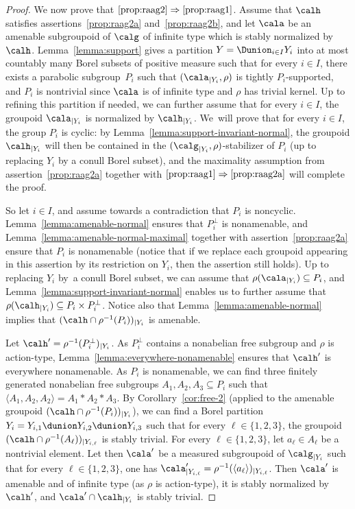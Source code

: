 \begin{proof}
We now prove that $\eqref{prop:raag2}\Rightarrow\eqref{prop:raag1}$. Assume that $\calh$ satisfies assertions~\eqref{prop:raag2a} and~\eqref{prop:raag2b}, and let $\cala$ be an amenable subgroupoid of $\calg$ of infinite type which is stably normalized by $\calh$. Lemma~\ref{lemma:support} gives a partition $Y=\Dunion_{i\in I} Y_i$ into at most countably many Borel subsets of positive measure such that for every $i\in I$, there exists a parabolic subgroup~$P_i$ such that $(\cala_{|Y_i},\rho)$ is tightly $P_i$-supported, and $P_i$ is nontrivial since $\cala$ is of infinite type and $\rho$ has trivial kernel. Up to refining this partition if needed, we can further assume that for every $i\in I$, the groupoid $\cala_{|Y_i}$ is normalized by $\calh_{|Y_i}$. We~will prove that for every $i\in I$, the group $P_i$ is cyclic: by Lemma~\ref{lemma:support-invariant-normal}, the groupoid $\calh_{|Y_i}$ will then be contained in the $(\calg_{|Y_i},\rho)$-stabilizer of $P_i$ (up to replacing $Y_i$ by a conull Borel subset), and the maximality assumption from assertion~\eqref{prop:raag2a} together with $\eqref{prop:raag1}\Rightarrow \eqref{prop:raag2a}$ will complete the proof.

So let $i\in I$, and assume towards a contradiction that $P_i$ is noncyclic. Lemma~\ref{lemma:amenable-normal} ensures that $P_i^\perp$ is nonamenable, and Lemma~\ref{lemma:amenable-normal-maximal} together with assertion~\eqref{prop:raag2a} ensure that $P_i$ is nonamenable (notice that if we replace each groupoid appearing in this assertion by its restriction on $Y_i$, then the assertion still holds). Up to replacing $Y_i$ by~a conull Borel subset, we can assume that $\rho(\cala_{|Y_i})\subseteq P_i$, and Lemma~\ref{lemma:support-invariant-normal} enables us to further assume that $\rho(\calh_{|Y_i})\subseteq P_i\times P_i^\perp$. Notice also that Lemma~\ref{lemma:amenable-normal} implies that $(\calh\cap\rho^{-1}(P_i))_{|Y_i}$ is amenable.

Let $\calh'=\rho^{-1}(P_i^{\perp})_{|Y_i}$. As $P_i^{\perp}$ contains a nonabelian free subgroup and $\rho$ is action-type, Lemma~\ref{lemma:everywhere-nonamenable} ensures that $\calh'$ is everywhere nonamenable. As $P_i$ is nonamenable, we can find three finitely generated nonabelian free subgroups $A_1,A_2,A_3\subseteq P_i$ such that $\langle A_1,A_2,A_2\rangle=A_1\ast A_2\ast A_3$. By Corollary~\ref{cor:free-2} (applied to the amenable groupoid $(\calh\cap\rho^{-1}(P_i))_{|Y_i}$), we can find a Borel partition $Y_i=Y_{i,1}\dunion Y_{i,2}\dunion Y_{i,3}$ such that for every $\ell\in\{1,2,3\}$, the groupoid $(\calh\cap\rho^{-1}(A_\ell))_{|Y_{i,\ell}}$ is stably trivial. For every $\ell\in\{1,2,3\}$, let $a_\ell\in A_\ell$ be a nontrivial element. Let then $\cala'$ be a measured subgroupoid of $\calg_{|Y_i}$ such that for every $\ell\in\{1,2,3\}$, one has $\cala'_{|Y_{i,\ell}}=\rho^{-1}(\langle a_\ell\rangle)_{|Y_{i,\ell}}$. Then $\cala'$ is amenable and of infinite type (as $\rho$ is action-type), it is stably normalized by $\calh'$, and $\cala'\cap\calh_{|Y_i}$ is stably trivial.


\end{proof}
